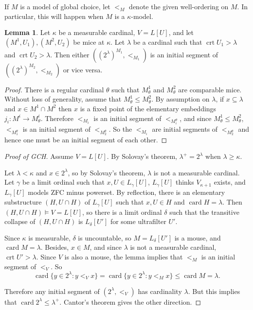 \documentclass[12pt]{report}
\newcommand{\card}{\operatorname{card}}
\DeclareMathOperator{\crt}{crt}
\theoremstyle{definition}
\newtheorem{lemma}[theorem]{Lemma}
\begin{document}
If $M$ is a model of global choice, let $<_M$ denote the given well-ordering on $M$.
In particular, this will happen when $M$ is a $\kappa$-model.

\begin{lemma}
Let $\kappa$ be a measurable cardinal, $V = L[U]$, and let $(M^1,U_1),(M^2,U_2)$ be mice at $\kappa$.
Let $\lambda$ be a cardinal such that $\crt U_1 > \lambda$ and $\crt U_2 > \lambda$. Then either $((2^\lambda)^{M_1}, <_{M_1})$ is an initial segment of $((2^\lambda)^{M_2}, <_{M_2})$ or vice versa.
\end{lemma}
\begin{proof}
There is a regular cardinal $\theta$ such that $M_\theta^1$ and $M_\theta^2$ are comparable mice. Without loss of generality, assume that $M_\theta^1 \leq M_\theta^2$.
By assumption on $\lambda$, if $x \subseteq \lambda$ and $x \in M^1 \cap M^2$ then $x$ is a fixed point of the elementary embeddings $j_i: M^i \to M_\theta^i$.
Therefore $<_{M_i}$ is an initial segment of $<_{M_i^\theta}$, and since $M_\theta^1 \leq M_\theta^2$, $<_{M_1^\theta}$ is an initial segment of $<_{M_2^\theta}$.
So the $<_{M_i}$ are initial segments of $<_{M_2^\theta}$ and hence one must be an initial segment of each other.
\end{proof}

\begin{proof}[Proof of GCH]
Assume $V = L[U]$. By Solovay's theorem, $\lambda^+ = 2^\lambda$ when $\lambda \geq \kappa$.

Let $\lambda < \kappa$ and $x \in 2^\lambda$, so by Solovay's theorem, $\lambda$ is not a measurable cardinal. Let $\gamma$ be a limit ordinal such that $x, U \in L_\gamma[U]$, $L_\gamma[U]$ thinks $V_{\kappa+1}$ exists, and $L_\gamma[U]$ models ZFC minus powerset.
By reflection, there is an elementary substructure $(H, U \cap H)$ of $L_\gamma[U]$ such that $x, U \in H$ and $\card H = \lambda$.
Then $(H, U \cap H) \models V = L[U]$, so there is a limit ordinal $\delta$ such that the transitive collapse of $(H, U \cap H)$ is $L_\delta[U']$
for some ultrafilter $U'$.

Since $\kappa$ is measurable, $\delta$ is uncountable, so $M = L_\delta[U']$ is a mouse, and $\card M = \lambda$.
Besides, $x \in M$, and since $\lambda$ is not a measurable cardinal, $\crt U' > \lambda$.
Since $V$ is also a mouse, the lemma implies that $<_M$ is an initial segment of $<_V$.
So
$$\card \{y \in 2^\lambda: y <_V x\} = \card \{y \in 2^\lambda: y <_M x\} \leq \card M = \lambda.$$

Therefore any initial segment of $(2^\lambda, <_V)$ has cardinality $\lambda$. But this implies that $\card 2^\lambda \leq \lambda^+$.
Cantor's theorem gives the other direction.
\end{proof}
\end{document}
